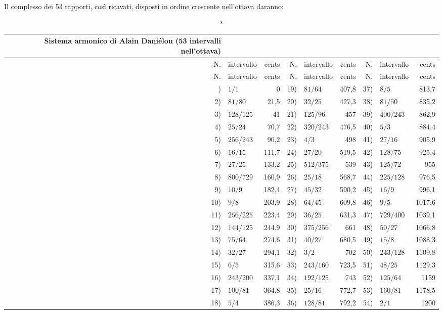 Il complesso dei 53 rapporti, così ricavati, disposti in ordine crescente
nell'ottava daranno:

{\footnotesize
\begin{longtable}{r @{\;} l r @{\qquad} r @{\;} l r @{\qquad} r @{\;} l r}
  \caption*{Sistema armonico di Alain Daniélou (53 intervalli nell'ottava)} \\
  \toprule
  N. & intervallo & cents & N. & intervallo & cents & N. & intervallo & cents \\
  \midrule
  \endfirsthead
  \toprule
  N. & intervallo & cents & N. & intervallo & cents & N. & intervallo & cents \\
  \midrule
  \endhead
  \midrule \endfoot
  \bottomrule \endlastfoot
   1) & $1/1$      & 0     & 19) & $81/64$    & 407,8 & 37) & $8/5$      & 813,7 \\
   2) & $81/80$    & 21,5  & 20) & $32/25$    & 427,3 & 38) & $81/50$    & 835,2 \\
   3) & $128/125$  & 41    & 21) & $125/96$   & 457   & 39) & $400/243$  & 862,9 \\
   4) & $25/24$    & 70,7  & 22) & $320/243$  & 476,5 & 40) & $5/3$      & 884,4 \\
   5) & $256/243$  & 90,2  & 23) & $4/3$      & 498   & 41) & $27/16$    & 905,9 \\
   6) & $16/15$    & 111,7 & 24) & $27/20$    & 519,5 & 42) & $128/75$   & 925,4 \\
   7) & $27/25$    & 133,2 & 25) & $512/375$  & 539   & 43) & $125/72$   & 955 \\
   8) & $800/729$  & 160,9 & 26) & $25/18$    & 568,7 & 44) & $225/128$  & 976,5 \\
   9) & $10/9$     & 182,4 & 27) & $45/32$    & 590,2 & 45) & $16/9$     & 996,1 \\
  10) & $9/8$      & 203,9 & 28) & $64/45$    & 609,8 & 46) & $9/5$      & 1017,6 \\
  11) & $256/225$  & 223,4 & 29) & $36/25$    & 631,3 & 47) & $729/400$  & 1039,1 \\
  12) & $144/125$  & 244,9 & 30) & $375/256$  & 661   & 48) & $50/27$    & 1066,8 \\
  13) & $75/64$    & 274,6 & 31) & $40/27$    & 680,5 & 49) & $15/8$     & 1088,3 \\
  14) & $32/27$    & 294,1 & 32) & $3/2$      & 702   & 50) & $243/128$  & 1109,8 \\
  15) & $6/5$      & 315,6 & 33) & $243/160$  & 723,5 & 51) & $48/25$    & 1129,3 \\
  16) & $243/200$  & 337,1 & 34) & $192/125$  & 743   & 52) & $125/64$   & 1159 \\
  17) & $100/81$   & 364,8 & 35) & $25/16$    & 772,7 & 53) & $160/81$   & 1178,5 \\
  18) & $5/4$      & 386,3 & 36) & $128/81$   & 792,2 & 54) & $2/1$      & 1200 \\
\end{longtable}
}

